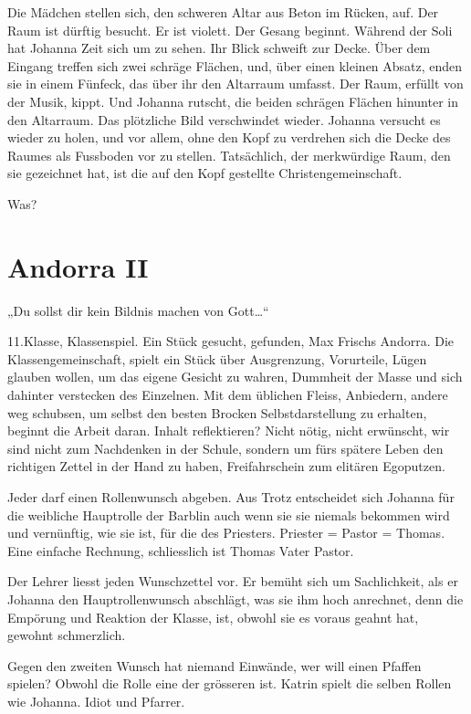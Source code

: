 \documentclass[10pt,titlepage,a5paper]{book}
\begin{document}
Die Mädchen stellen sich, den schweren Altar aus Beton im Rücken, auf. Der Raum ist dürftig besucht. Er ist violett. Der Gesang beginnt. Während der Soli hat Johanna Zeit sich um zu sehen. Ihr Blick schweift zur Decke. Über dem Eingang treffen sich zwei schräge Flächen, und, über einen kleinen Absatz, enden sie in einem Fünfeck, das über ihr den Altarraum umfasst.
Der Raum, erfüllt von der Musik, kippt. Und Johanna rutscht, die beiden schrägen Flächen hinunter  in den Altarraum. Das plötzliche Bild verschwindet wieder. Johanna versucht es wieder zu holen, und vor allem, ohne den Kopf zu verdrehen sich die Decke des Raumes als Fussboden vor zu stellen. Tatsächlich, der merkwürdige Raum, den sie gezeichnet hat, ist die auf den Kopf gestellte Christengemeinschaft. 

Was?

 
 \section*{Andorra II}
 

 
„Du sollst dir kein Bildnis machen von Gott\dots “

11.Klasse, Klassenspiel. Ein Stück gesucht, gefunden, Max Frischs Andorra. Die Klassengemeinschaft, spielt ein Stück über Ausgrenzung, Vorurteile, Lügen glauben wollen, um das eigene Gesicht zu wahren, Dummheit der Masse und sich dahinter verstecken des Einzelnen. Mit dem üblichen Fleiss, Anbiedern, andere weg schubsen, um selbst den besten Brocken Selbstdarstellung zu erhalten, beginnt die Arbeit daran. Inhalt reflektieren? Nicht nötig, nicht erwünscht, wir sind nicht zum Nachdenken in der Schule, sondern um fürs spätere Leben den richtigen Zettel in der Hand zu haben, Freifahrschein zum elitären Egoputzen.

Jeder darf einen Rollenwunsch abgeben. Aus Trotz entscheidet sich Johanna für die weibliche Hauptrolle der Barblin auch wenn sie sie niemals bekommen wird und vernünftig, wie sie ist, für die des Priesters. Priester = Pastor = Thomas. Eine einfache Rechnung, schliesslich ist Thomas Vater Pastor.

Der Lehrer liesst jeden Wunschzettel vor. Er bemüht sich um Sachlichkeit, als er Johanna den Hauptrollenwunsch abschlägt, was sie ihm hoch anrechnet, denn die Empörung und Reaktion der Klasse, ist, obwohl sie es voraus geahnt hat, gewohnt schmerzlich.

Gegen den zweiten Wunsch hat niemand Einwände, wer will einen Pfaffen spielen? Obwohl die Rolle eine der grösseren ist. Katrin spielt die selben Rollen wie Johanna. Idiot und Pfarrer.
\end{document}
